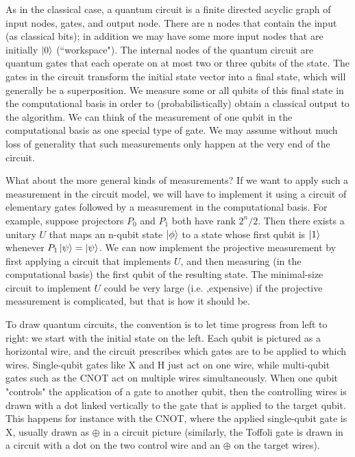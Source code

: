 As in the classical case, a quantum circuit is a finite directed acyclic graph of input nodes, gates, and output node. There are n nodes that contain the input (as classical bits); in addition we may have some more input nodes that are initially $\ket{0}$ (``workspace"). The internal nodes of the quantum circuit are quantum gates that each operate on at most two or three qubits of the state. The gates in the circuit transform the initial state vector into a final state, which will generally be a superposition. We measure some or all qubits of this final state in the computational basis in order to (probabilistically) obtain a classical output to the algorithm. We can think of the measurement of one qubit in the computational basis as one special type of gate. We may assume without much loss of generality that such measurements only happen at the very end of the circuit. 

What about the more general kinds of measurements? If we want to apply such a measurement in the circuit model, we will have to implement it using a circuit of elementary gates followed by a measurement in the computational basis. For example, suppose projectors $P_0$ and $P_1$ both have rank $2^n/2$. Then there exists a unitary $U$ that maps an n-qubit state $\ket{\phi}$ to a state whose first qubit is $\ket{1}$ whenever $P_1\ket{\psi}=\ket{\psi}$. We can now implement the projective measurement by first applying a circuit that implements $U$, and then measuring (in the computational basis) the first qubit of the resulting state. The minimal-size circuit to implement $U$ could be very large (i.e. ,expensive) if the projective measurement is complicated, but that is how it should be.

To draw quantum circuits, the convention is to let time progress from left to right: we start with the initial state on the left. Each qubit is pictured as a horizontal wire, and the circuit prescribes which gates are to be applied to which wires. Single-qubit gates like X and H just act on one wire, while multi-qubit gates such as the CNOT act on multiple wires simultaneously. When one qubit "controls" the application of a gate to another qubit, then the controlling wires is drawn with a dot linked vertically to the gate that is applied to the target qubit. This happens for instance with the CNOT, where the applied single-qubit gate is X, usually drawn as $\oplus$ in a circuit picture (similarly, the Toffoli gate is drawn in a circuit with a dot on the two control wire and an $\oplus$ on the target wires).


